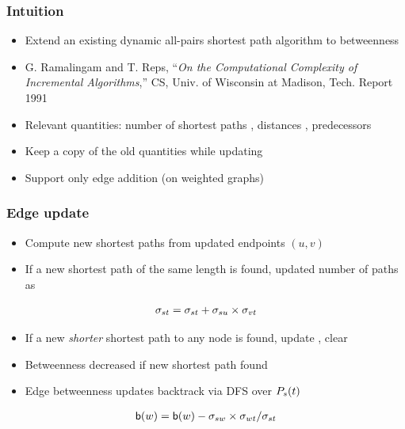 \begin{frame}
  \frametitle{Intuition}
  
  \begin{itemize}
    \item Extend an existing dynamic all-pairs shortest path algorithm to betweenness
    \item G. Ramalingam and T. Reps, ``\emph{On the Computational Complexity of Incremental Algorithms},'' CS, Univ. of Wisconsin at Madison, Tech. Report 1991
    \item Relevant quantities: number of shortest paths \paths, distances \dist, predecessors \pred
    \item Keep a copy of the old quantities while updating
    \item Support only edge addition (on weighted graphs)
  \end{itemize}
    
\end{frame}


\begin{frame}
  \frametitle{Edge update}
  
  \begin{itemize}
    \item Compute new shortest paths from updated endpoints $(u,v)$
    \item If a new shortest path of the same length is found, updated number of paths as
  \end{itemize}
  {\Large
  \begin{align*}
    \sigma_{st} = \sigma_{st} + \sigma_{su} \times \sigma_{vt}
  \end{align*}
  }
    \begin{itemize}
    \item If a new \emph{shorter} shortest path to any node is found, update \dist, clear \paths
    \item Betweenness decreased if new shortest path found
    \item Edge betweenness updates backtrack via DFS over $P_s(t)$
  \end{itemize}
    {\Large
  \begin{align*}
    \mathsf{b}(w) = \mathsf{b}(w) - \sigma_{sw} \times \sigma_{wt} / \sigma_{st}
  \end{align*}
  }
\end{frame}


